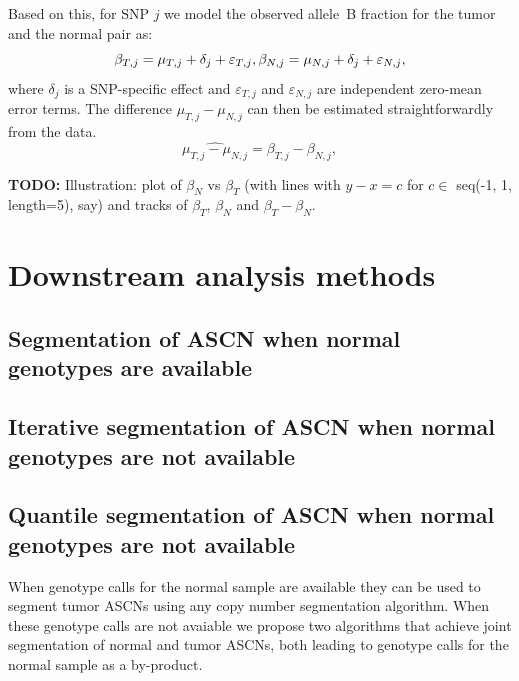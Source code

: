 \documentclass[]{bioinfo}
\newcommand{\eps}{\varepsilon\xspace}
\newenvironment{TODO}{\color{red}\textbf{TODO:}}{}
\begin{document}
\begin{methods}
Based on this, for SNP $j$ we model the observed allele~B fraction for the tumor and the normal pair as:
\begin{equation}
  \beta_{T,j} = \mu_{T,j} + \delta_{j} + \eps_{T,j},\\
  \beta_{N,j} = \mu_{N,j} + \delta_{j} + \eps_{N,j},
  \label{eqnFracBModel}
\end{equation}
where $\delta_{j}$ is a SNP-specific effect and $\eps_{T,j}$ and $\eps_{N,j}$ are independent zero-mean error terms. The difference $\mu_{T,j}-\mu_{N,j}$ can then be estimated straightforwardly from the data.
\begin{equation}
  \widehat{\mu_{T,j}-\mu_{N,j}} = \beta_{T,j} - \beta_{N,j},
  \label{eqnTumorBoostEstimate}
\end{equation}

\begin{TODO}
  Illustration: plot of $\beta_N$ vs $\beta_T$ (with lines with $y-x=c$ for $c \in$ seq(-1, 1, length=5), say) and tracks of $\beta_T$, $\beta_N$ and $\beta_T-\beta_N$. 
\end{TODO}

\section{Downstream analysis methods}
\label{sec:downstr-analys-meth}

\subsection{Segmentation of ASCN when normal genotypes are available}
\label{sec:segm-ascn-with-genotypes}

\subsection{Iterative segmentation of ASCN when normal genotypes are not available}
\label{sec:iter-segm-ascn}

\subsection{Quantile segmentation of ASCN when normal genotypes are not available}
\label{sec:quant-segm-ascn}


 When genotype calls for the normal sample are available they can be used to segment tumor ASCNs using any copy number segmentation algorithm. When these genotype calls are not avaiable we propose two algorithms that achieve joint segmentation of normal and tumor ASCNs, both leading to genotype calls for the normal sample as a by-product. 


\end{methods}
\end{document}
